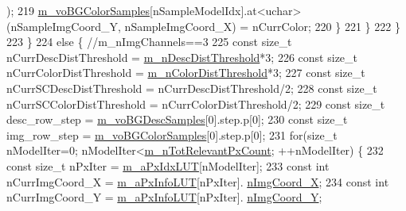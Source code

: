 \begin{DoxyCode}
      );
219                     \mbox{\hyperlink{class_background_subtractor_l_o_b_s_t_e_r_ac981b39f8ae7b28d3e4326d8e6be6332}{m\_voBGColorSamples}}[nSampleModelIdx].at<uchar>(nSampleImgCoord\_Y,
      nSampleImgCoord\_X) = nCurrColor;
220                 \}
221             \}
222         \}
223     \}
224     \textcolor{keywordflow}{else} \{ \textcolor{comment}{//m\_nImgChannels==3}
225         \textcolor{keyword}{const} \textcolor{keywordtype}{size\_t} nCurrDescDistThreshold = \mbox{\hyperlink{class_background_subtractor_l_o_b_s_t_e_r_abe3f4a836343e901746e4f243f5252e4}{m\_nDescDistThreshold}}*3;
226         \textcolor{keyword}{const} \textcolor{keywordtype}{size\_t} nCurrColorDistThreshold = \mbox{\hyperlink{class_background_subtractor_l_o_b_s_t_e_r_a37a37a0a46fc8e33d954c33c1318d7b2}{m\_nColorDistThreshold}}*3;
227         \textcolor{keyword}{const} \textcolor{keywordtype}{size\_t} nCurrSCDescDistThreshold = nCurrDescDistThreshold/2;
228         \textcolor{keyword}{const} \textcolor{keywordtype}{size\_t} nCurrSCColorDistThreshold = nCurrColorDistThreshold/2;
229         \textcolor{keyword}{const} \textcolor{keywordtype}{size\_t} desc\_row\_step = \mbox{\hyperlink{class_background_subtractor_l_o_b_s_t_e_r_a3c49866ae652423b2173215957907d04}{m\_voBGDescSamples}}[0].step.p[0];
230         \textcolor{keyword}{const} \textcolor{keywordtype}{size\_t} img\_row\_step = \mbox{\hyperlink{class_background_subtractor_l_o_b_s_t_e_r_ac981b39f8ae7b28d3e4326d8e6be6332}{m\_voBGColorSamples}}[0].step.p[0];
231         \textcolor{keywordflow}{for}(\textcolor{keywordtype}{size\_t} nModelIter=0; nModelIter<\mbox{\hyperlink{class_background_subtractor_l_b_s_p_ac3b54f4d2dfa3a576475214f26501d85}{m\_nTotRelevantPxCount}}; ++nModelIter) \{
232             \textcolor{keyword}{const} \textcolor{keywordtype}{size\_t} nPxIter = \mbox{\hyperlink{class_background_subtractor_l_b_s_p_a06b4f0d3f24fa08bccd3c9eca085713e}{m\_aPxIdxLUT}}[nModelIter];
233             \textcolor{keyword}{const} \textcolor{keywordtype}{int} nCurrImgCoord\_X = \mbox{\hyperlink{class_background_subtractor_l_b_s_p_a74e73d4832ccdef652d93756582024db}{m\_aPxInfoLUT}}[nPxIter].
      \mbox{\hyperlink{struct_background_subtractor_l_b_s_p_1_1_px_info_base_a10966fe72f000045adede9e853156b48}{nImgCoord\_X}};
234             \textcolor{keyword}{const} \textcolor{keywordtype}{int} nCurrImgCoord\_Y = \mbox{\hyperlink{class_background_subtractor_l_b_s_p_a74e73d4832ccdef652d93756582024db}{m\_aPxInfoLUT}}[nPxIter].
      \mbox{\hyperlink{struct_background_subtractor_l_b_s_p_1_1_px_info_base_a42cb6eecda647b2a11b90ea420f2bc31}{nImgCoord\_Y}};

\end{DoxyCode}

